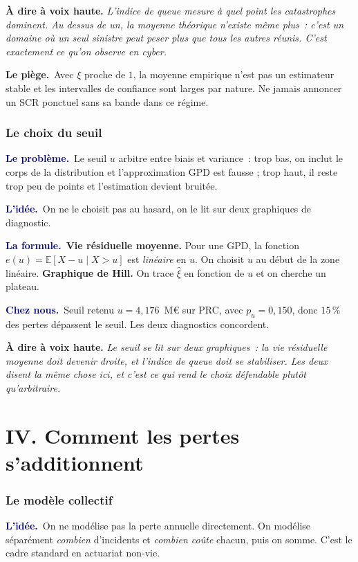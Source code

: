 \documentclass[11pt,a4paper]{article}
\newcommand{\lequoi}[1]{\smallskip\noindent\textcolor{navy}{\textbf{Le problème.}}\ #1\par}
\newcommand{\lidee}[1]{\smallskip\noindent\textcolor{navy}{\textbf{L'idée.}}\ #1\par}
\newcommand{\laformule}[1]{\smallskip\noindent\textcolor{navy}{\textbf{La formule.}}\ #1\par}
\newcommand{\cheznous}[1]{\smallskip\noindent\textcolor{navy}{\textbf{Chez nous.}}\ #1\par}
\newcommand{\lepiege}[1]{\smallskip\noindent\textcolor{accent}{\textbf{Le piège.}}\ #1\par}
\newcommand{\laphrase}[1]{\begin{phrasebox}\textbf{À dire à voix haute.} \emph{#1}\end{phrasebox}}
\begin{document}
\laphrase{L'indice de queue mesure à quel point les catastrophes dominent. Au dessus de un,
la moyenne théorique n'existe même plus~: c'est un domaine où un seul sinistre peut peser
plus que tous les autres réunis. C'est exactement ce qu'on observe en cyber.}

\lepiege{Avec $\xi$ proche de $1$, la moyenne empirique n'est pas un estimateur stable et
les intervalles de confiance sont larges par nature. Ne jamais annoncer un SCR ponctuel
sans sa bande dans ce régime.}

\section{Le choix du seuil}

\lequoi{Le seuil $u$ arbitre entre biais et variance~: trop bas, on inclut le corps de la
distribution et l'approximation GPD est fausse ; trop haut, il reste trop peu de points et
l'estimation devient bruitée.}

\lidee{On ne le choisit pas au hasard, on le lit sur deux graphiques de diagnostic.}

\laformule{\textbf{Vie résiduelle moyenne.} Pour une GPD, la fonction
$e(u)=\mathbb{E}[X-u\mid X>u]$ est \emph{linéaire} en $u$. On choisit $u$ au début de la
zone linéaire.
\textbf{Graphique de Hill.} On trace $\hat\xi$ en fonction de $u$ et on cherche un plateau.}

\cheznous{Seuil retenu $u=4{,}176$~M\euro{} sur PRC, avec $p_u=0{,}150$, donc $15\,\%$ des
pertes dépassent le seuil. Les deux diagnostics concordent.}

\laphrase{Le seuil se lit sur deux graphiques~: la vie résiduelle moyenne doit devenir
droite, et l'indice de queue doit se stabiliser. Les deux disent la même chose ici, et c'est
ce qui rend le choix défendable plutôt qu'arbitraire.}

\part*{IV. Comment les pertes s'additionnent}

\section{Le modèle collectif}

\lidee{On ne modélise pas la perte annuelle directement. On modélise séparément
\emph{combien} d'incidents et \emph{combien coûte} chacun, puis on somme. C'est le cadre
standard en actuariat non-vie.}
\end{document}

